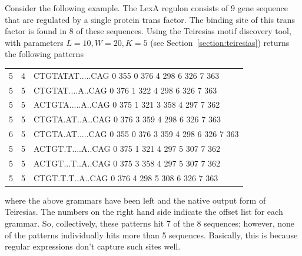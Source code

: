 Consider the following example.  The LexA regulon consists of 9 gene
sequence that are regulated by a single protein trans factor.  The
binding site of this trans factor is found in 8 of these sequences.
Using the Teiresias motif discovery tool, with parameters $L=10,
W=20, K=5$ (see Section~\vref{section:teiresias}) returns the
following patterns\\
    {
    \begin{center}
    \ttfamily
        \begin{singlespace}
    \begin{tabular}{ccl}
        5 & 4 & CTGTATAT.....CAG 0 355 0 376 4 298 6 326 7 363 \\
        5 & 5 & CTGTAT....A..CAG 0 376 1 322 4 298 6 326 7 363 \\
        5 & 5 & ACTGTA.....A..CAG 0 375 1 321 3 358 4 297 7 362 \\
        5 & 5 & CTGTA.AT..A..CAG 0 376 3 359 4 298 6 326 7 363\\
        6 & 5 & CTGTA.AT.....CAG 0 355 0 376 3 359 4 298 6 326 7 363\\
        5 & 5 & ACTGT.T....A..CAG 0 375 1 321 4 297 5 307 7 362\\
        5 & 5 & ACTGT...T..A..CAG 0 375 3 358 4 297 5 307 7 362\\
        5 & 5 & CTGT.T.T..A..CAG 0 376 4 298 5 308 6 326 7 363
    \end{tabular}
        \end{singlespace}

    \end{center}
    }
where the above grammars have been left and the native output form
of Teiresias.  The numbers on the right hand side indicate the
offset list for each grammar. So, collectively, these patterns hit 7
of the 8 sequences; however, none of the patterns individually hits
more than 5 sequences. Basically, this is because regular
expressions don't capture such sites well.


